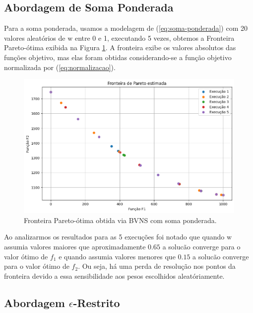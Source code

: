 \documentclass[conference]{IEEEtran}
\begin{document}
\subsection{Abordagem de Soma Ponderada}

Para a soma ponderada, usamos a modelagem de (\ref{eq:soma-ponderada})
com 20 valores aleatórios de $\mathrm{w}$ entre 0 e 1, 
executando 5 vezes, obtemos a Fronteira Pareto-ótima exibida na 
Figura \ref{fig:tc2-somaponderada}. A fronteira exibe os valores absolutos das funções objetivo, mas 
elas foram obtidas considerando-se a função objetivo normalizada por (\ref{eq:normalizacao}).

\begin{figure}[h!]
	\caption{\label{fig:tc2-somaponderada}Fronteira Pareto-ótima obtida via BVNS com soma ponderada.}
	\begin{center}
    \includegraphics[width=\columnwidth,trim=1 1 1 1,clip]{tc2-somaponderada.png}
	\end{center}
\end{figure}

Ao analizarmos os resultados para as 5 execuções foi notado que
quando $\mathrm{w}$ assumia valores maiores que aproximadamente $0.65$ a solucão converge para o valor ótimo de $f_1$ e quando assumia valores menores que $0.15$
a solucão converge para o valor ótimo de $f_2$. Ou seja, há uma perda de resolução nos pontos da fronteira devido a essa sensibilidade aos pesos escolhidos aleatóriamente.

\subsection{Abordagem $\epsilon$-Restrito}
\end{document}
